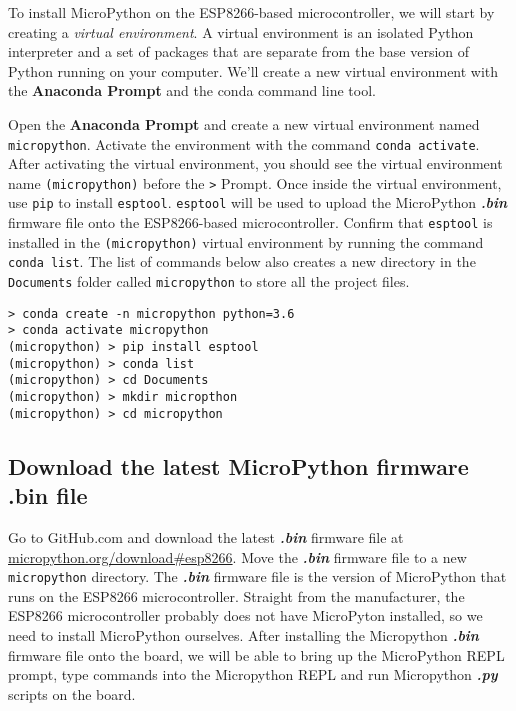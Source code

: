 \documentclass{book}
\newcommand{\passthrough}[1]{#1}
\begin{document}
    
        To install MicroPython on the ESP8266-based microcontroller, we will
start by creating a \emph{virtual environment}. A virtual environment is
an isolated Python interpreter and a set of packages that are separate
from the base version of Python running on your computer. We'll create a
new virtual environment with the \textbf{Anaconda Prompt} and the conda
command line tool.

Open the \textbf{Anaconda Prompt} and create a new virtual environment
named \passthrough{\lstinline!micropython!}. Activate the environment
with the command \passthrough{\lstinline!conda activate!}. After
activating the virtual environment, you should see the virtual
environment name \passthrough{\lstinline!(micropython)!} before the
\passthrough{\lstinline!>!} Prompt. Once inside the virtual environment,
use \passthrough{\lstinline!pip!} to install
\passthrough{\lstinline!esptool!}. \passthrough{\lstinline!esptool!}
will be used to upload the MicroPython \textbf{\emph{.bin}} firmware
file onto the ESP8266-based microcontroller. Confirm that
\passthrough{\lstinline!esptool!} is installed in the
\passthrough{\lstinline!(micropython)!} virtual environment by running
the command \passthrough{\lstinline!conda list!}. The list of commands
below also creates a new directory in the
\passthrough{\lstinline!Documents!} folder called
\passthrough{\lstinline!micropython!} to store all the project files.

\begin{lstlisting}
> conda create -n micropython python=3.6
> conda activate micropython
(micropython) > pip install esptool
(micropython) > conda list
(micropython) > cd Documents
(micropython) > mkdir micropthon
(micropython) > cd micropython
\end{lstlisting}
    




    
        \hypertarget{download-the-latest-micropython-firmware-.bin-file}{%
\subsection{Download the latest MicroPython firmware .bin
file}\label{download-the-latest-micropython-firmware-.bin-file}}
    




    
        Go to GitHub.com and download the latest \textbf{\emph{.bin}} firmware
file at
\href{https://micropython.org/download\#esp8266}{micropython.org/download\#esp8266}.
Move the \textbf{\emph{.bin}} firmware file to a new
\passthrough{\lstinline!micropython!} directory. The
\textbf{\emph{.bin}} firmware file is the version of MicroPython that
runs on the ESP8266 microcontroller. Straight from the manufacturer, the
ESP8266 microcontroller probably does not have MicroPyton installed, so
we need to install MicroPython ourselves. After installing the
Micropython \textbf{\emph{.bin}} firmware file onto the board, we will
be able to bring up the MicroPython REPL prompt, type commands into the
Micropython REPL and run Micropython \textbf{\emph{.py}} scripts on the
board.
\end{document}
